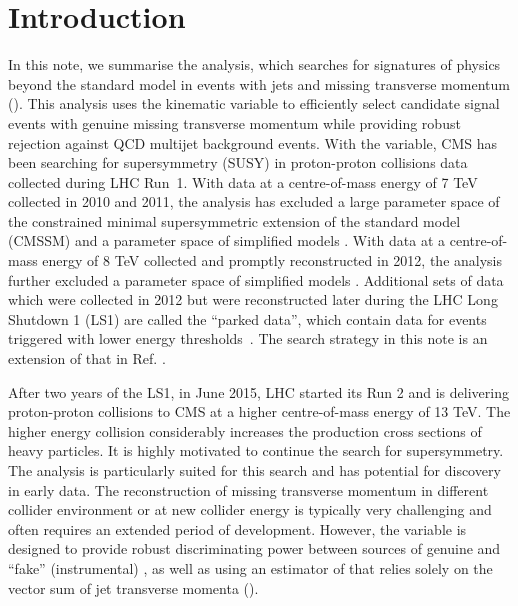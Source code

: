 \section{Introduction}
\label{sec:intro}

In this note, we summarise the \alphat
analysis, which searches for signatures of physics beyond the standard
model in events with jets and missing transverse momentum (\met). This
analysis uses the kinematic variable \alphat to efficiently select
candidate signal events with genuine missing transverse momentum while
providing robust rejection against QCD multijet background
events. With the \alphat variable, CMS has been searching for
supersymmetry (SUSY) in proton-proton collisions data collected during
LHC Run~1. With data at a centre-of-mass energy of 7 TeV collected in
2010 and 2011, the \alphat analysis has excluded a large parameter
space of the constrained minimal supersymmetric extension of the
standard model (CMSSM) \cite{Khachatryan:2011tk, Chatrchyan:2011zy,
  Chatrchyan:2012wa} and a parameter space of simplified models
\cite{Chatrchyan:2012wa}. With data at a centre-of-mass energy of 8
TeV collected and promptly reconstructed in 2012, the \alphat analysis
further excluded a parameter space of simplified models
\cite{Chatrchyan:2013lya}. Additional sets of data which were
collected in 2012 but were reconstructed later during the LHC Long
Shutdown 1 (LS1) are called the ``parked data'', which contain data
for events triggered with lower energy
thresholds~\cite{CMS_AN_2013-366}.
The search strategy in this note is an extension of that in Ref.
\cite{CMS_AN_2013-366}.

After two years of the LS1, in June 2015, LHC started its Run 2 and is
delivering proton-proton collisions to CMS at a higher centre-of-mass
energy of 13 TeV. The higher energy collision considerably increases
the production cross sections of heavy particles. It is highly
motivated to continue the search for supersymmetry. The \alphat
analysis is particularly suited for this search and has potential for
discovery in early data. The reconstruction of missing transverse
momentum in different collider environment or at new collider energy
is typically very challenging and often requires an extended period of
development. However, the \alphat variable is designed to provide
robust discriminating power between sources of genuine and ``fake''
(\eg instrumental) \met, as well as using an estimator of \met that
relies solely on the vector sum of jet transverse momenta (\mht).

